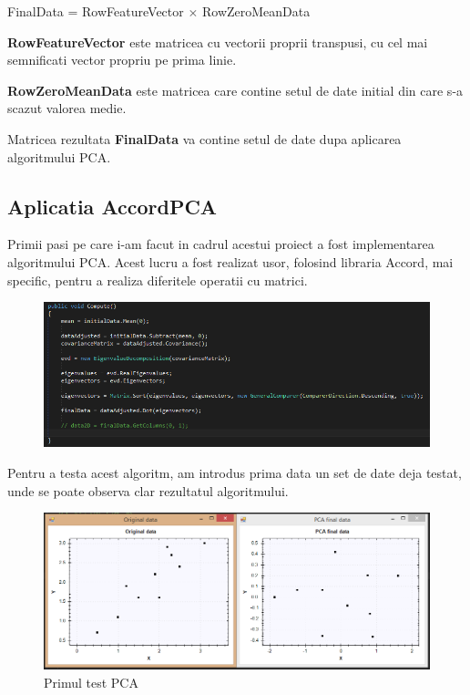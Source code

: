 \documentclass[12pt,oneside]{article}
\begin{document}
FinalData = RowFeatureVector $\times$ RowZeroMeanData

\textbf{RowFeatureVector} este matricea cu vectorii proprii transpusi, cu cel mai semnificati vector propriu pe prima linie.

\textbf{RowZeroMeanData} este matricea care contine setul de date initial din care s-a scazut valorea medie.

Matricea rezultata \textbf{FinalData} va contine setul de date dupa aplicarea algoritmului PCA.
\newpage

\subsection{Aplicatia AccordPCA}
Primii pasi pe care i-am facut in cadrul acestui proiect a fost implementarea algoritmului PCA. Acest lucru a fost realizat usor, folosind libraria Accord, mai specific, pentru a realiza diferitele operatii cu matrici. \cite{accord_pca}

\begin{figure}[H]
\centering
\includegraphics[width=\linewidth]{Compute}
\end{figure}

Pentru a testa acest algoritm, am introdus prima data un set de date deja testat, unde se poate observa clar rezultatul algoritmului.\cite{data_reduction}
\begin{figure}[H]
\centering
\caption{Primul test PCA}
\includegraphics[width=\linewidth]{Test1}
\end{figure}
\newpage
\end{document}
